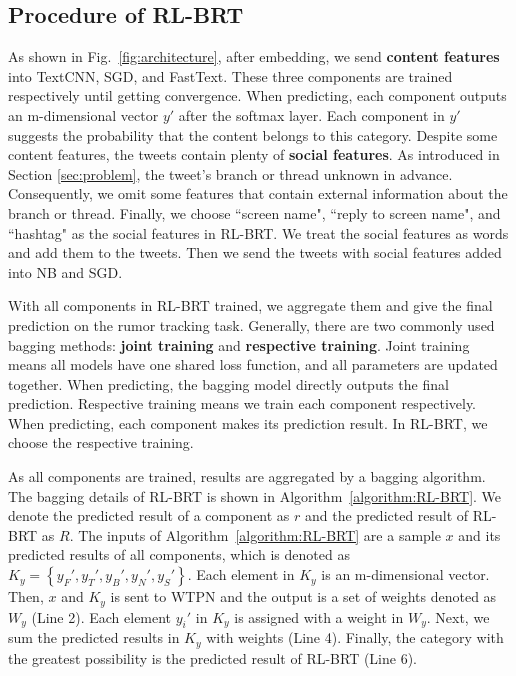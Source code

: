 \subsection{Procedure of RL-BRT}
As shown in Fig.~\ref{fig:architecture}, after embedding, we send \textbf{content features} into TextCNN, SGD, and FastText. These three components are trained respectively until getting convergence. When predicting, each component outputs an m-dimensional vector $y'$ after the softmax layer. Each component in $y'$ suggests the probability that the content belongs to this category. Despite some content features, the tweets contain plenty of \textbf{social features}. As introduced in Section \ref{sec:problem}, the tweet's branch or thread unknown in advance. Consequently, we omit some features that contain external information about the branch or thread. Finally, we choose ``screen name", ``reply to screen name", and ``hashtag" as the social features in RL-BRT. We treat the social features as words and add them to the tweets. Then we send the tweets with social features added into NB and SGD. 

With all components in RL-BRT trained, we aggregate them and give the final prediction on the rumor tracking task. Generally, there are two commonly used bagging methods: \textbf{joint training} and \textbf{respective training}. Joint training means all models have one shared loss function, and all parameters are updated together. When predicting, the bagging model directly outputs the final prediction. Respective training means we train each component respectively. When predicting, each component makes its prediction result. In RL-BRT, we choose the respective training. 

As all components are trained, results are aggregated by a bagging algorithm. The bagging details of RL-BRT is shown in Algorithm~\ref{algorithm:RL-BRT}. We denote the predicted result of a component as $r$ and the predicted result of RL-BRT as $R$. The inputs of Algorithm~\ref{algorithm:RL-BRT} are a sample $x$ and its predicted results of all components, which is denoted as $K_y = \left\{y_F', y_T', y_B', y_N', y_S' \right\}$. Each element in $K_y$ is an m-dimensional vector. Then, $x$ and $K_y$ is sent to WTPN and the output is a set of weights denoted as $W_y$ (Line 2). Each element $y_i'$ in $K_y$ is assigned with a weight in $W_y$. Next, we sum the predicted results in $K_y$ with weights (Line 4). Finally, the category with the greatest possibility is the predicted result of RL-BRT (Line 6). 

